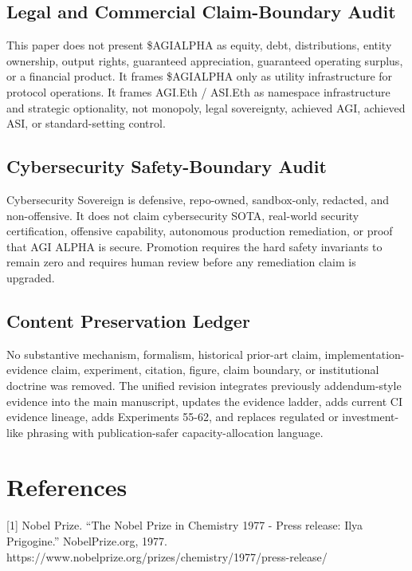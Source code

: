 \subsection{Legal and Commercial Claim-Boundary
Audit}\label{legal-and-commercial-claim-boundary-audit}

This paper does not present \$AGIALPHA as equity, debt, distributions,
entity ownership, output rights, guaranteed appreciation, guaranteed
operating surplus, or a financial product. It frames \$AGIALPHA only as
utility infrastructure for protocol operations. It frames AGI.Eth /
ASI.Eth as namespace infrastructure and strategic optionality, not
monopoly, legal sovereignty, achieved AGI, achieved ASI, or
standard-setting control.

\subsection{Cybersecurity Safety-Boundary
Audit}\label{cybersecurity-safety-boundary-audit}

Cybersecurity Sovereign is defensive, repo-owned, sandbox-only,
redacted, and non-offensive. It does not claim cybersecurity SOTA,
real-world security certification, offensive capability, autonomous
production remediation, or proof that AGI ALPHA is secure. Promotion
requires the hard safety invariants to remain zero and requires human
review before any remediation claim is upgraded.

\subsection{Content Preservation
Ledger}\label{content-preservation-ledger}

No substantive mechanism, formalism, historical prior-art claim,
implementation-evidence claim, experiment, citation, figure, claim
boundary, or institutional doctrine was removed. The unified revision
integrates previously addendum-style evidence into the main manuscript,
updates the evidence ladder, adds current CI evidence lineage, adds
Experiments 55-62, and replaces regulated or investment-like phrasing
with publication-safer capacity-allocation language.

\section{References}\label{references}

{[}1{]} Nobel Prize. ``The Nobel Prize in Chemistry 1977 - Press
release: Ilya Prigogine.'' NobelPrize.org, 1977.
https://www.nobelprize.org/prizes/chemistry/1977/press-release/

